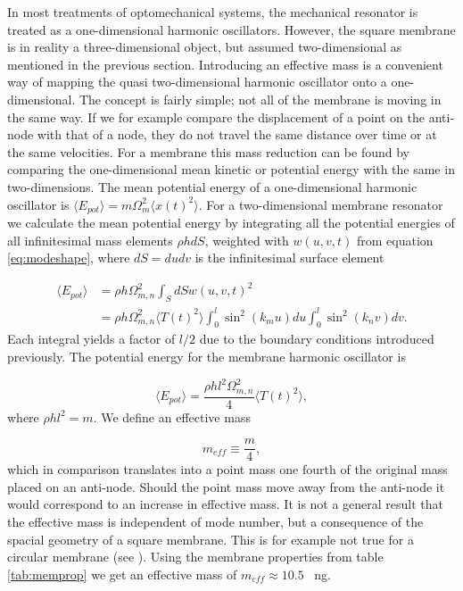 In most treatments of optomechanical systems, the mechanical resonator is treated as a one-dimensional harmonic oscillators. However, the square membrane is in reality a three-dimensional object, but assumed two-dimensional as mentioned in the previous section. Introducing an effective mass is a convenient way of mapping the quasi two-dimensional harmonic oscillator onto a one-dimensional. The concept is fairly simple; not all of the membrane is moving in the same way. If we for example compare the displacement of a point on the anti-node with that of a node, they do not travel the same distance over time or at the same velocities. For a membrane this mass reduction can be found by comparing the one-dimensional mean kinetic or potential energy with the same in two-dimensions. The mean potential energy of a one-dimensional harmonic oscillator is $\langle E_{pot} \rangle = m\Omega_{m}^2\langle x(t)^2 \rangle$. For a two-dimensional membrane resonator we calculate the mean potential energy by integrating all the potential energies of all infinitesimal mass elements $\rho h dS$, weighted with $w(u,v,t)$ from equation \eqref{eq:modeshape}, where $dS = dudv$ is the infinitesimal surface element

\begin{equation}
\begin{split}
\langle E_{pot} \rangle & = \rho h \Omega_{m,n}^2 \int_S dS w(u,v,t)^2 \\
 & = \rho h \Omega_{m,n}^2 \langle T(t)^2 \rangle \int_0^l \sin^2(k_m u) du \int_0^l \sin^2(k_n v) dv.
\end{split}
\end{equation}
\noindent
Each integral yields a factor of $l/2$ due to the boundary conditions introduced previously. The potential energy for the membrane harmonic oscillator is

\begin{equation}
\langle E_{pot} \rangle = \frac{\rho h l^2 \Omega_{m,n}^2}{4} \langle T(t)^2 \rangle,
\end{equation}
\noindent
where $\rho hl^2 = m$. We define an effective mass 

\begin{equation}
m_{eff} \equiv \frac{m}{4},
\end{equation}
\noindent
which in comparison translates into a point mass one fourth of the original mass placed on an anti-node. Should the point mass move away from the anti-node it would correspond to an increase in effective mass. It is not a general result that the effective mass is independent of mode number, but a consequence of the spacial geometry of a square membrane. This is for example not true for a circular membrane (see \cite{Wilson2011}). Using the membrane properties from table \ref{tab:memprop} we get an effective mass of $m_{eff} \approx 10.5$ \SI{}{\nano\gram}.
%
